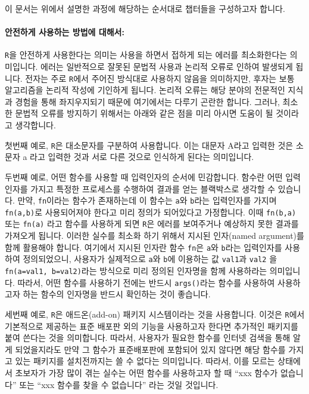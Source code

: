 \documentclass[tutorial.tex]{subfiles}
\begin{document}
이 문서는 위에서 설명한 과정에 해당하는 순서대로 챕터들을 구성하고자 합니다.
%
%

\paragraph{안전하게 사용하는 방법에 대해서:}

\texttt{R}을 안전하게 사용한다는 의미는 사용을 하면서 접하게 되는 에러를 최소화한다는 의미입니다.
에러는 일반적으로  잘못된 문법적 사용과 논리적 오류로 인하여 발생되게 됩니다.
전자는 주로 \texttt{R}에서 주어진 방식대로 사용하지 않음을 의미하지만, 후자는 보통 알고리즘을 논리적 작성에 기인하게 됩니다.
논리적 오류는 해당 분야의 전문적인 지식과 경험을 통해 좌지우지되기 때문에 여기에서는 다루기 곤란한 합니다. 
그러나, 최소한 문법적 오류를 방지하기 위해서는 아래와 같은 점을 미리 아시면 도움이 될 것이라고 생각합니다. 

첫번째 예로, \texttt{R}은 대소문자를 구분하여 사용합니다.
이는 대문자 A라고 입력한 것은 소문자 a 라고 입력한 것과 서로 다른 것으로 인식하게 된다는 의미입니다.

두번째 예로, 어떤 함수를 사용할 때 입력인자의 순서에 민감합니다.
함수란 어떤 입력인자를 가지고 특정한 프로세스를 수행하여 결과를 얻는 블랙박스로 생각할 수 있습니다. 
만약, \texttt{fn}이라는 함수가 존재하는데 이 함수는  \texttt{a}와 \texttt{b}라는 입력인자를 가지며 \texttt{fn(a,b)}로 사용되어져야 한다고 미리 정의가 되어있다고 가정합니다.
이때 \texttt{fn(b,a)} 또는 \texttt{fn(a)} 라고 함수를 사용하게 되면 \texttt{R}은 에러를 보여주거나 예상하지 못한 결과를 가져오게 됩니다. 
이러한 실수를 최소화 하기 위해서 지시된 인자(named argument)를 함께 활용해야 합니다.
여기에서 지시된 인자란 함수 \texttt{fn}은 \texttt{a}와 \texttt{b}라는 입력인자를 사용하여 정의되었으니, 사용자가 실제적으로 \texttt{a}와 \texttt{b}에 이용하는 값 \texttt{val1}과 \texttt{val2} 을 \texttt{fn(a=val1, b=val2)}라는 방식으로 미리 정의된 인자명을 함께 사용하라는 의미입니다. 
따라서, 어떤 함수를 사용하기 전에는 반드시 \texttt{args()}라는 함수를 사용하여 사용하고자 하는 함수의 인자명을 반드시 확인하는 것이 좋습니다. 

세번째 예로, \texttt{R}은 애드온(add-on) 패키지 시스템이라는 것을 사용합니다.
이것은 \texttt{R}에서 기본적으로 제공하는 표준 배포판 외의 기능을 사용하고자 한다면 추가적인 패키지를 붙여 쓴다는 것을 의미합니다. 
따라서, 사용자가 필요한 함수를 인터넷 검색을 통해 알게 되었을지라도 만약 그 함수가 표준배포판에 포함되어 있지 않다면 해당 함수를 가지고 있는 패키지를 설치전까지는 쓸 수 없다는 의미입니다. 
따라서, 이를 모르는 상태에서 초보자가 가장 많이 겪는 실수는 어떤 함수를 사용하고자 할 때 ``xxx 함수가 없습니다'' 또는 ``xxx 함수를 찾을 수 없습니다'' 라는 것일 것입니다. 
\end{document}
